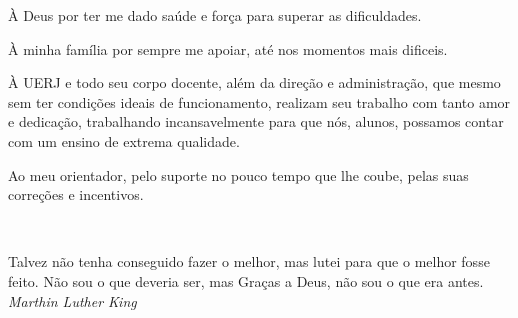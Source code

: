 \documentclass[a4paper,12pt,oneside,onecolumn,final,fleqn]{repUERJ}
\theoremstyle{plain}
\theoremstyle{definition}
\begin{document}



À Deus por ter me dado saúde e força para superar as dificuldades.


À minha família por sempre me apoiar, até nos momentos mais dificeis.


À UERJ e todo seu corpo docente, além da direção e administração, que mesmo sem ter condições ideais de funcionamento, realizam seu trabalho com tanto amor e dedicação, trabalhando incansavelmente para que nós, alunos, possamos contar com um ensino de extrema qualidade.


Ao meu orientador, pelo suporte no pouco tempo que lhe coube, pelas suas correções e incentivos.


\pretextualchapter{}

  \vfill\
  \begin{flushright}
 Talvez não tenha conseguido fazer o melhor, mas lutei para que o melhor fosse 		 feito. Não sou o que deveria ser, mas Graças a Deus, não sou o que era antes. \\
    \textsl{Marthin Luther King}
  \end{flushright}



\end{document}
